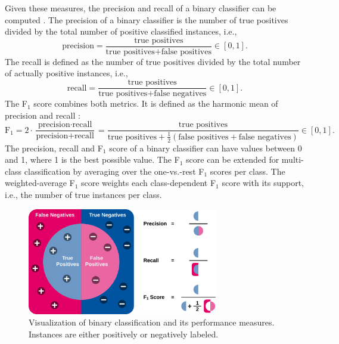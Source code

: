 Given these measures, the precision and recall of a binary classifier can be computed \cite{DBLP:journals/corr/abs-2010-16061}.
The precision of a binary classifier is the number of true positives divided by the total number of positive classified instances, i.e.,
\begin{equation*}
	\textrm{precision} = \dfrac{\textrm{true positives}}{\textrm{true positives} + \textrm{false positives}} \in [0,1].
\end{equation*}
The recall is defined as the number of true positives divided by the total number of actually positive instances, i.e.,
\begin{equation*}
	\textrm{recall} = \dfrac{\textrm{true positives}}{\textrm{true positives} + \textrm{false negatives}} \in [0,1].
\end{equation*}
The F$_1$ score combines both metrics. It is defined as the harmonic mean of precision and recall \cite{DBLP:journals/corr/abs-2010-16061}:
\begin{equation*}
	\textrm{F}_1= 2 \cdot \dfrac{\textrm{precision} \cdot \textrm{recall}}{\textrm{precision} + \textrm{recall}} = \dfrac{\textrm{true positives}}{\textrm{true positives} + \frac{1}{2} (\textrm{false positives}+\textrm{false negatives})} \in [0,1].
\end{equation*}
The precision, recall and F$_1$ score of a binary classifier can have values between 0 and 1, where 1 is the best possible value.
The F$_1$ score can be extended for multi-class classification by averaging over the one-vs.-rest F$_1$ scores per class.
The weighted-average F$_1$ score weights each class-dependent F$_1$ score with its support, i.e., the number of true instances per class.

\begin{figure}[htbp!]
	\centering
	\includegraphics[width=0.75\textwidth]{figures/binary-classification}
	\caption[Visualization of binary classification and its performance measures]{Visualization of binary classification and its performance measures. Instances are either positively or negatively labeled.}
	\label{fig:/binary-classification}
\end{figure}

